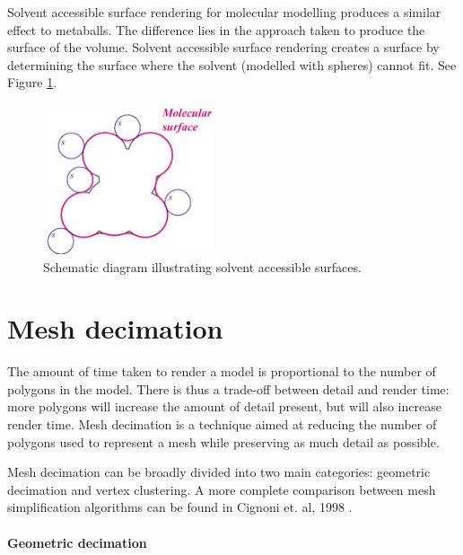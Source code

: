 Solvent accessible surface rendering for molecular modelling \citep{connolly83}
produces a similar effect to metaballs. The difference lies in the approach
taken to produce the surface of the volume. Solvent accessible surface
rendering creates a surface by determining the surface where the solvent
(modelled with spheres) cannot fit. See Figure \ref{fig:background_sas}.

\begin{figure}[h!]
  \begin{center}
    \includegraphics[width=50mm]{sas_ms}
  \end{center}
  \caption{Schematic diagram illustrating solvent accessible surfaces.}
  \label{fig:background_sas}
\end{figure}



\section{Mesh decimation}
\label{sec:background_decimation}

The amount of time taken to render a model is proportional to the number of
polygons in the model.  There is thus a trade-off between detail and render
time: more polygons will increase the amount of detail present, but will also
increase render time.  Mesh decimation is a technique aimed at reducing the
number of polygons used to represent a mesh while preserving as much detail as
possible.

Mesh decimation can be broadly divided into two main categories: geometric
decimation and vertex clustering. A more complete comparison between mesh
simplification algorithms can be found in Cignoni et. al, 1998
\citet{cignoni98}.

\paragraph{Geometric decimation}

